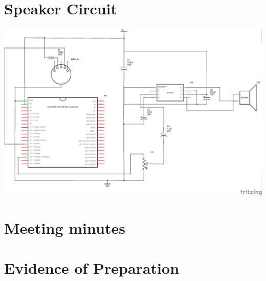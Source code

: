 \section{Speaker Circuit}
\begin{center}
\includegraphics[width=1.0\textwidth]{./midi_speaker_schem.png}
\end{center}
\clearpage
\section{Meeting minutes}


\section{Evidence of Preparation}




